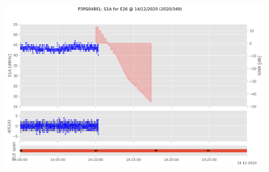 \begin{enumerate}
\begin{figure}[H]%
\centering%
\includegraphics[width=0.95\linewidth]{png/P3RS04BEL_R_20203490000_01D_00U_MO_E-S1A-E26.png}%
\end{figure}


\end{enumerate}
